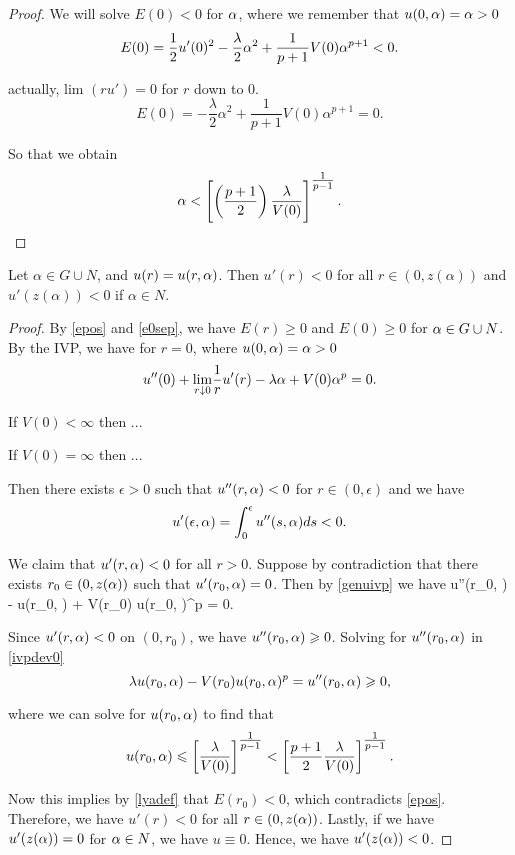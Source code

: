 \begin{proof}
We will solve $E(0) < 0$ for $\alpha$, where we remember that $u(0, \alpha) = \alpha > 0$
\[ 
    E(0) = \frac{1}{2} u'(0)^2 - \frac{\lambda}{2} \alpha^2
    + \frac{1}{p+1} V(0) \alpha^{p+1} < 0. 
\]

{\red actually, lim $(ru') = 0$ for $r$ down to $0$. 
\[ 
    E(0) = -\frac{\lambda}{2}\alpha^2 + 
    \frac{1}{p+1} V(0)\alpha^{p+1} = 0. 
\]}

So that we obtain 
\[
\alpha < \left[\left( \frac{p+1}{2}\right) \frac{\lambda}{V(0)}
\right]^{\tfrac{1}{p-1}} .
\]


\end{proof}

\begin{lemma}\label{genlem2}
Let $\alpha \in G \cup N$, and $u(r) = u(r, \alpha)$. Then $u'(r) < 0$ for all
$r \in (0, z(\alpha))$ and $u'(z(\alpha)) < 0$ if $\alpha \in N$.
\end{lemma}
\begin{proof}
{\red By \eqref{epos} and \eqref{e0sep}, we have $E(r) \geq 0$ and $E(0) \geq 
0$ for $\alpha \in G \cup N$.} By the IVP, we have for $r=0$, where $u(0, \alpha) = \alpha >
0$
\[ u''(0) + \underset{r \downarrow 0}{\lim} \frac{1}{r} u'(r) -
\lambda \alpha + V(0) \alpha^p = 0. \]

{\red If $V(0) < \infty$ then ...

If $V(0) = \infty$ then ...}

Then there exists $\epsilon > 0$ such that $u''(r, \alpha) < 0$ for $r \in (0,
\epsilon)$ and we have
\[ u'(\epsilon, \alpha) = \int_0^\epsilon u''(s, \alpha) ds < 0. \]

\donegroup
We claim that $u'(r, \alpha) < 0$ for all $r > 0$. Suppose by contradiction that
there exists $r_0 \in (0,z(\alpha))$ such that $u'(r_0, \alpha)=0$. Then by
\eqref{genuivp} we have 
\be \label{ivpdev0} 
u''(r_0, \a) - \lambda u(r_0, \a) + V(r_0) u(r_0, \a)^p = 0. 
\ee

Since $u'(r, \alpha) < 0$ on $(0, r_0)$, we have $u''(r_0, \alpha) \geqslant 0$. 
Solving for $u''(r_0, \alpha)$ in \eqref{ivpdev0} 
\[ \lambda u(r_0,\alpha) - V(r_0) u(r_0,\alpha)^p = u''(r_0, \alpha) \geqslant 0, \]

where we can solve for $u(r_0, \alpha)$ to find that
\[ u(r_0, \alpha) \leqslant \left[ \frac{\lambda}{V(0)} \right]^{\tfrac{1}{p-1}} <
\left[ \frac{p+1}{2} \frac{\lambda}{V(0)} \right]^{\tfrac{1}{p-1}}. \]
\endgroup

Now this implies by \eqref{lyadef} 
that $E(r_0) <
0$, which contradicts \eqref{epos}. Therefore, we have $u'(r) < 0$ for all $r
\in (0, z(\alpha))$. 
Lastly, if we have $u'(z(\alpha)) = 0$ for $\alpha \in N$, we have $u
\equiv 0$. Hence, we have $u'(z(\alpha)) < 0$.
\end{proof}

